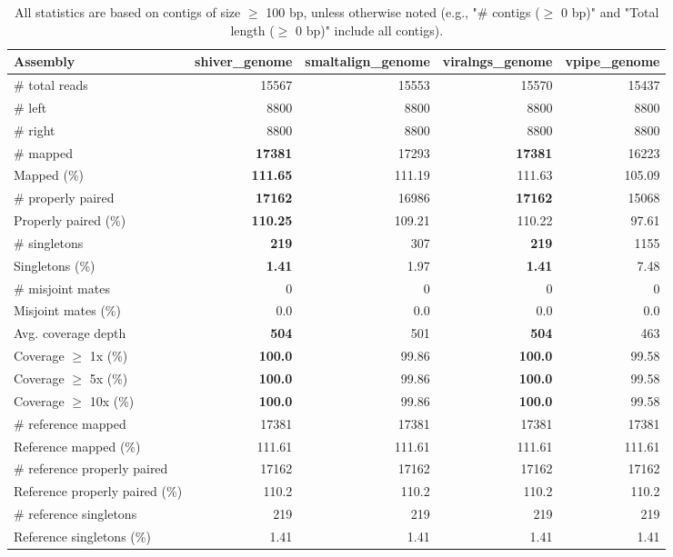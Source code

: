 \documentclass[12pt,a4paper]{article}
\begin{document}
\begin{table}[ht]
\begin{center}
\caption{All statistics are based on contigs of size $\geq$ 100 bp, unless otherwise noted (e.g., "\# contigs ($\geq$ 0 bp)" and "Total length ($\geq$ 0 bp)" include all contigs).}
\begin{tabular}{|l*{4}{|r}|}
\hline
Assembly & shiver\_genome & smaltalign\_genome & viralngs\_genome & vpipe\_genome \\ \hline
\# total reads & 15567 & 15553 & 15570 & 15437 \\ \hline
\# left & 8800 & 8800 & 8800 & 8800 \\ \hline
\# right & 8800 & 8800 & 8800 & 8800 \\ \hline
\# mapped & {\bf 17381} & 17293 & {\bf 17381} & 16223 \\ \hline
Mapped (\%) & {\bf 111.65} & 111.19 & 111.63 & 105.09 \\ \hline
\# properly paired & {\bf 17162} & 16986 & {\bf 17162} & 15068 \\ \hline
Properly paired (\%) & {\bf 110.25} & 109.21 & 110.22 & 97.61 \\ \hline
\# singletons & {\bf 219} & 307 & {\bf 219} & 1155 \\ \hline
Singletons (\%) & {\bf 1.41} & 1.97 & {\bf 1.41} & 7.48 \\ \hline
\# misjoint mates & 0 & 0 & 0 & 0 \\ \hline
Misjoint mates (\%) & 0.0 & 0.0 & 0.0 & 0.0 \\ \hline
Avg. coverage depth & {\bf 504} & 501 & {\bf 504} & 463 \\ \hline
Coverage $\geq$ 1x (\%) & {\bf 100.0} & 99.86 & {\bf 100.0} & 99.58 \\ \hline
Coverage $\geq$ 5x (\%) & {\bf 100.0} & 99.86 & {\bf 100.0} & 99.58 \\ \hline
Coverage $\geq$ 10x (\%) & {\bf 100.0} & 99.86 & {\bf 100.0} & 99.58 \\ \hline
\# reference mapped & 17381 & 17381 & 17381 & 17381 \\ \hline
Reference mapped (\%) & 111.61 & 111.61 & 111.61 & 111.61 \\ \hline
\# reference properly paired & 17162 & 17162 & 17162 & 17162 \\ \hline
Reference properly paired (\%) & 110.2 & 110.2 & 110.2 & 110.2 \\ \hline
\# reference singletons & 219 & 219 & 219 & 219 \\ \hline
Reference singletons (\%) & 1.41 & 1.41 & 1.41 & 1.41 \\ \hline

\end{tabular}
\end{center}
\end{table}
\end{document}
